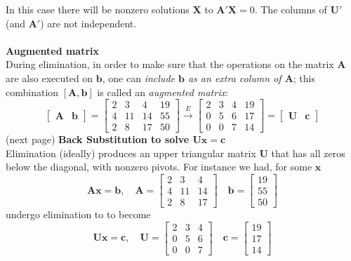 \documentclass{report}
\begin{document}
In this case there will be nonzero solutions $\bm X$ to $\bm A'\bm X=0$. The columns of $\bm U'$ (and $\bm A'$) are not independent.\\
\vspace{1mm}\\
\textbf{Augmented matrix}\\
During elimination, in order to make sure that the operations on the matrix $\bm A$ are also executed on $\bm b$, one can 
\textit{include $\bm b$ as an extra column of $\bm A$}; this combination $[\bm A,\bm b]$ is called an \textit{augmented matrix}:
\begin{equation*}
\left[\begin{array}{cc}\bm A&\bm b\end{array}\right]=
\left[\begin{array}{cccc}
2&3&4&19\\
4&11&14&55\\
2&8&17&50
\end{array}\right]\xrightarrow{E}
\left[\begin{array}{cccc}
2&3&4&19\\
0&5&6&17\\
0&0&7&14
\end{array}\right]=
\left[\begin{array}{cc}\bm U&\bm c\end{array}\right]
\end{equation*}
(next page)\newpage
\noindent\textbf{Back Substitution to solve $\bm{Ux}=\bm c$}\\
Elimination (ideally) produces an upper triangular matrix $\bm U$ that has all zeros below the diagonal, with nonzero pivots. For instance we had, for some $\bm x$
\begin{equation*}
\bm{Ax}=\bm b,\quad\bm A=\left[\begin{array}{ccc}
2&3&4\\
4&11&14\\
2&8&17
\end{array}\right]\quad
\bm b=\left[\begin{array}{c}
19\\55\\50
\end{array}\right]
\end{equation*}
undergo elimination to to become
\begin{equation*}
\bm{Ux}=\bm c,\quad\bm U=\left[\begin{array}{ccc}
2&3&4\\
0&5&6\\
0&0&7
\end{array}\right]\quad
\bm c=\left[\begin{array}{c}
19\\17\\14
\end{array}\right]
\end{equation*}
\end{document}
